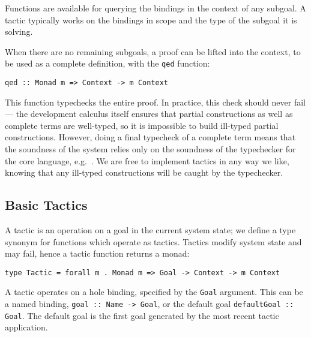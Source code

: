 
Functions are available for querying the bindings in the context of
any subgoal. A tactic typically works on the bindings in scope and the
type of the subgoal it is solving.

When there are no remaining subgoals, a proof can be lifted into the
context, to be used as a complete definition, with the \texttt{qed}
function:

\begin{verbatim}
qed :: Monad m => Context -> m Context
\end{verbatim}

This function typechecks the entire proof. In practice, this check
should never fail --- the development calculus itself ensures that
partial constructions as well as complete terms are well-typed, so it
is impossible to build ill-typed partial constructions. However, doing
a final typecheck of a complete term means that the soundness of the
system relies only on the soundness of the typechecker for the core
language, e.g.~\cite{coq-in-coq}.  We are free to implement tactics in
any way we like, knowing that any ill-typed constructions will be
caught by the typechecker.


\subsection{Basic Tactics}

A tactic is an operation on a goal in the current system state; we
define a type synonym  for functions which operate as
tactics. Tactics modify system state and may fail, hence a tactic
function returns a monad:
%
\begin{verbatim}
type Tactic = forall m . Monad m => Goal -> Context -> m Context
\end{verbatim}
%
A tactic operates on a hole binding, specified by the \texttt{Goal}
argument. This can be a named binding, \texttt{goal :: Name -> Goal},
or the default goal \texttt{defaultGoal :: Goal}. The default goal is
the first goal generated by the most recent tactic application.

